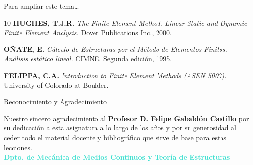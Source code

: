\documentclass[10pt, aspectratio=43]{beamer}
\begin{document}
\begin{frame}{Para ampliar este tema\dots}{}
  \begin{thebibliography}{10}
    \textbf{HUGHES, T.J.R.}
    \newblock \emph{The Finite Element Method. Linear Static and Dynamic Finite Element Analysis.}
    \newblock Dover Publications Inc., 2000.
    \vspace{0.4cm}
    
    \textbf{OÑATE, E.}
    \newblock \emph{Cálculo de Estructuras por el Método de Elementos Finitos. Análisis estático lineal.}
    \newblock CIMNE. Segunda edición, 1995.
    \vspace{0.4cm}
    
    \textbf{FELIPPA, C.A.}
    \newblock \emph{Introduction to Finite Element Methods (ASEN 5007).}
    \newblock University of Colorado at Boulder.
  \end{thebibliography}
\end{frame}

\begin{frame}{Reconocimiento y Agradecimiento}{}
  \vfill
  \begin{uicard}[borderline north={4pt}{0pt}{Turquoise}, left=15pt, right=15pt, top=18pt, bottom=18pt]
    \centering
    {\normalsize \textcolor{TextDark}{
      Nuestro sincero agradecimiento al \textbf{Profesor D. Felipe Gabaldón Castillo} por su dedicación a esta asignatura a lo largo de los años y por su generosidad al ceder todo el material docente y bibliográfico que sirve de base para estas lecciones.
    }}\\[0.6cm]
    
    \textcolor{Turquoise}{\small\bfseries Dpto. de Mecánica de Medios Continuos y Teoría de Estructuras}
  \end{uicard}
  \vfill
\end{frame}
\end{document}
